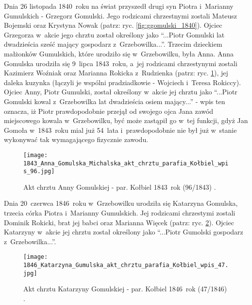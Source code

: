Dnia 26 listopada 1840~roku na świat przyszedł drugi syn Piotra i~Marianny 
Gumulskich - Grzegorz Gomulski. Jego rodzicami chrzestnymi zostali Mateusz 
Bojemski oraz Krystyna Nowak (patrz: ryc. \ref{fig:ggomulski_1840}). Ojciec 
Grzegorza w~akcie jego chrztu został określony jako \enquote{...Piotr 
Gomulski lat dwadzieścia sześć mający gospodarz z~Grzebowilka...}. Trzecim 
dzieckiem małżonków Gumulskich, które urodziło się w~Grzebowilku, była 
Anna. Anna Gomulska urodziła się 9~lipca 1843~roku, a~jej rodzicami 
chrzestynymi zostali Kazimierz Woźniak oraz Marianna Rokicka z~Rudzienka 
(patrz: ryc. \ref{fig:agomulska_1843}), jej daleka kuzynka (łączyli je 
wspólni pradziadkowie - Wojciech i~Teresa Rokiccy). Ojciec Anny, Piotr 
Gumulski, został określony w~akcie jej chrztu jako \enquote{...Piotr 
Gomulski kowal z~Grzebowilka lat dwadzieścia osiem mający...} - wpis ten 
oznacza, iż Piotr prawdopodobnie przejął od swojego ojca Jana zawód 
miejscowego kowala w~Grzebowilku, być może zastąpił go w~tej funkcji, gdyż 
Jan Gomoła w~1843~roku mial już 54~lata i~prawdopodobnie nie był już w~stanie 
wykonywać tak wymagającego fizycznie zawodu.

\begin{figure}[!ht]
    \vspace*{0.5cm}
    \centering \texttt{[image: 
        1843\_Anna\_Gomulska\_Michalska\_akt\_chrztu\_parafia\_Kołbiel\_wpis\_96.jpg]}
    \captionsetup{format=hang}
    \caption{Akt chrztu Anny Gomulskiej - par. Kołbiel 1843~rok (96/1843) 
    \cite{par_kolbiel2}.}
    \label{fig:agomulska_1843}
\end{figure}

Dnia 20~czerwca 1846~roku w~Grzebowilku urodziła się Katarzyna Gomulska, 
trzecia córka Piotra i~Marianny Gumulskich. Jej rodzicami chrzestymi zostali 
Dominik Rokicki, brat jej babci oraz Marianna Więcek (patrz: ryc. 
\ref{fig:kgomulska_1846}). Ojciec Katarzyny w~akcie jej chrztu został 
określony jako \enquote{...Piotr Gumolski gospodarz z~Grzebowilka...}.

\begin{figure}[!ht]
    \vspace*{0.5cm}
    \centering \texttt{[image: 
        1846\_Katarzyna\_Gumulska\_akt\_chrztu\_parafia\_Kołbiel\_wpis\_47.jpg]}
    \captionsetup{format=hang}
    \caption{Akt chrztu Katarzyny Gomulskiej - par. Kołbiel 1846~rok 
    (47/1846) \cite{par_kolbiel2}.}
    \label{fig:kgomulska_1846}
\end{figure}

